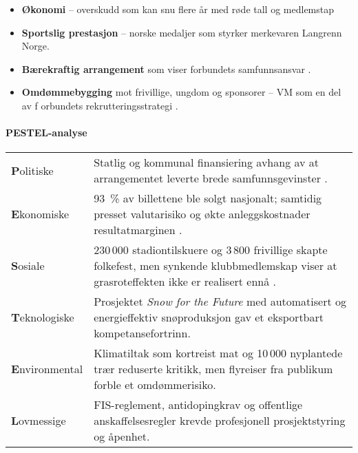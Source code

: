 \begin{itemize}
    \item \textbf{Økonomi} -- overskudd som kan snu flere år med røde tall og 
    medlemstap\cite{Adresseavisen}

    \item \textbf{Sportslig prestasjon} -- norske medaljer som styrker merkevaren Langrenn Norge.
    
    \item \textbf{Bærekraftig arrangement} som viser forbundets samfunnsansvar \cite{TrondheimKommuneVM}.

    \item \textbf{Omdømmebygging} mot frivillige, ungdom og sponsorer -- VM som en del av f
    orbundets rekrutteringsstrategi \cite{OsloVM}.
\end{itemize}

\paragraph{PESTEL-analyse}

\begin{table}[ht]
    \centering
    \begin{tabular}{@{}p{2.7cm}p{10.2cm}@{}}
        \toprule                                                                                                                                            \\ \midrule
        \textbf{P}olitiske     & Statlig og kommunal finansiering avhang av at arrangementet leverte brede samfunnsgevinster \cite{TrondheimKommuneVM}.                                                       \\
        \textbf{E}konomiske    & 93~\% av billettene ble solgt nasjonalt; samtidig presset valutarisiko og økte anleggskostnader resultatmarginen \cite{AdressaKjopefest}.                                  \\
        \textbf{S}osiale       & 230\,000 stadiontilskuere og 3\,800 frivillige skapte folkefest, men synkende klubbmedlemskap viser at grasroteffekten ikke er realisert ennå \cite{Adresseavisen,OsloVM}. \\
        \textbf{T}eknologiske  & Prosjektet \textit{Snow for the Future} med automatisert og energieffektiv snøproduksjon gav et eksportbart kompetansefortrinn\cite{Trondheim2025Sustainability}.          \\
        \textbf{E}nvironmental & Klimatiltak som kortreist mat og 10\,000 nyplantede trær reduserte kritikk, men flyreiser fra publikum forble et omdømmerisiko.                                            \\
        \textbf{L}ovmessige    & FIS-reglement, antidopingkrav og offentlige anskaffelsesregler krevde profesjonell prosjektstyring og åpenhet.                                                             \\ \bottomrule
    \end{tabular}
\end{table}

